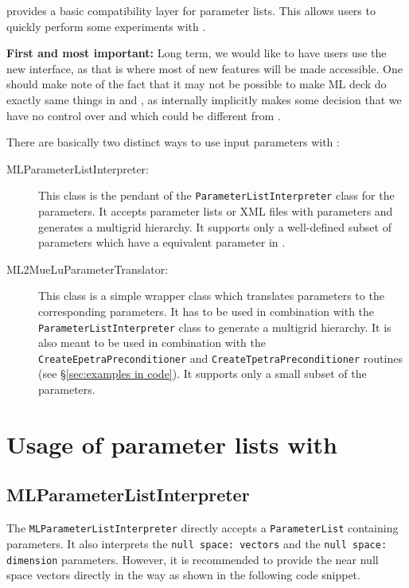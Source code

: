  
\label{sec:ml_options}
\muelu provides a basic compatibility layer for \ml parameter lists. This allows \ml users to quickly perform some experiments with \muelu. 

\textbf{First and most important: } Long term, we would like to have users use the new \muelu interface, as that is where most of new features will be made accessible. One should make note of the fact that it may not be possible to make ML deck do exactly same things in \ml and \muelu, as internally \ml implicitly makes some decision that we have no control over and which could be different from \muelu.

\noindent There are basically two distinct ways to use \ml input parameters with \muelu:
\begin{description}
\item[MLParameterListInterpreter:] This class is the pendant of the \texttt{ParameterListInterpreter} class for the \muelu parameters. It accepts parameter lists or XML files with \ml parameters and generates a \muelu multigrid hierarchy. It supports only a well-defined subset of \ml parameters which have a equivalent parameter in \muelu.
\item[ML2MueLuParameterTranslator:] This class is a simple wrapper class which translates \ml parameters to the corresponding \muelu parameters. It has to be used in combination with the \muelu \texttt{ParameterListInterpreter} class to generate a \muelu multigrid hierarchy. It is also meant to be used in combination with the \texttt{CreateEpetraPreconditioner} and \texttt{CreateTpetraPreconditioner} routines (see \S\ref{sec:examples in code}). It supports only a small subset of the \ml parameters.
\end{description}

\section{Usage of \ml parameter lists with \muelu}

\subsection{MLParameterListInterpreter}

The \texttt{MLParameterListInterpreter} directly accepts a \texttt{ParameterList} containing \ml parameters. It also interprets the \texttt{null space: vectors} and the \texttt{null space: dimension} \ml parameters. However, it is recommended to provide the near null space vectors directly in the \muelu way as shown in the following code snippet.

